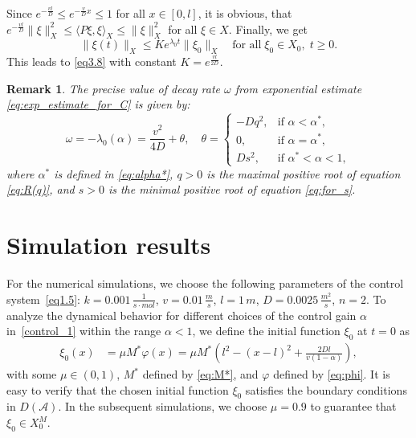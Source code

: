 \documentclass{mpi2015-cscpreprint}
\newtheorem{remark}{Remark}[section]
\numberwithin{equation}{section}
\begin{document}
Since $e^{-\frac{vl}{D}}\leq e^{-\frac{v}{D}x} \leq 1$ for all $x\in[0,l]$, it is obvious, that $e^{-\frac{vl}{D}} \|\xi\|_X^2 \le \langle P\xi,\xi\rangle_{X} \le \|\xi\|_X^2$ for all $\xi\in X$.
Finally, we get
\begin{equation*}
\|\xi(t)\|_X
\le K e^{\lambda_0t}\|\xi_0\|_X
\quad \text{for all}\; \xi_0\in X_0,\; t\ge 0.
\end{equation*}
This leads to \eqref{eq3.8} with constant $K=e^{\frac{vl}{2D}}$.



\begin{remark}\label{rem3}
The precise value of decay rate $\omega$ from exponential estimate \eqref{eq:exp_estimate_for_C} is given by:
\begin{equation*}
    \omega=-\lambda_0(\alpha)=\frac{v^2}{4D}+\theta,\quad \theta=
    \begin{cases}
    -Dq^2, &\text{if }\alpha < \alpha^*,\\
    0, &\text{if }\alpha = \alpha^*,\\
    Ds^2, &\text{if }\alpha^*<\alpha <1,
    \end{cases}
\end{equation*}
where $\alpha^*$ is defined in \eqref{eq:alpha*}, $q>0$ is the maximal positive root of equation \eqref{eq:R(q)}, and $s>0$ is the minimal positive root of equation \eqref{eq:for_s}.
\end{remark}


\section{Simulation results}\label{sec:num}

For the numerical simulations, we choose the following parameters of the control system~\eqref{eq1.5}:
$k=0.001\,\tfrac{1}{s\cdot mol}$, $v=0.01\,\tfrac{m}{s}$,
$l=1\,m$, $D=0.0025\,\tfrac{m^2}{s}$, $n=2$.
To analyze the dynamical behavior for different choices of the control gain $\alpha$ in~\eqref{control_1} within the range { $\alpha<1$}, we define the initial function $\xi_0$ at $t=0$ as
\begin{equation}\label{w0fun}
\begin{aligned}
\xi_0(x)&=\mu M^* \varphi(x)= \mu M^*\left(l^2-(x-l)^2+\tfrac{2Dl}{v(1-\alpha)}\right),
\end{aligned}
\end{equation}
{ with some $\mu\in(0,1)$, $M^*$ defined by \eqref{eq:M*}, and $\varphi$ defined by \eqref{eq:phi}}. 
It is easy to verify that the chosen initial function $\xi_0$ satisfies the boundary conditions in $D(\mathcal A)$.
{ In the subsequent simulations, we choose  $\mu=0.9$ to guarantee that $\xi_0\in X_0^M$.}
\end{document}
